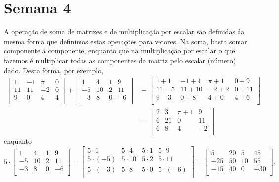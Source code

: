 \documentclass[../livro.tex]{subfiles}  %
\begin{document}
\chapter{Semana 4}


A operação de soma de matrizes e de multiplicação por escalar são definidas da mesma forma que definimos estas operações para vetores. Na soma, basta somar componente a componente, enquanto que na multiplicação por escalar o que fazemos é multiplicar todas as componentes da matriz pelo escalar (número) dado. Desta forma, por exemplo,
\begin{align*}
\left[
\begin{array}{cccc}
1 & -1 & \pi & 0 \\
11 & 11 & -2 & 0 \\
9 & 0 & 4 & 4 \\
\end{array}
\right] +
\left[
\begin{array}{cccc}
1 & 4 & 1 & 9 \\
-5 & 10 & 2 & 11 \\
-3 & 8 & 0 & -6 \\
\end{array}
\right] & =
\left[
\begin{array}{cccc}
1+1 & -1 +4 & \pi + 1 & 0+ 9 \\
11-5 & 11+10 & -2+2 & 0+11 \\
9-3 & 0+8 & 4+0 & 4-6 \\
\end{array}
\right] \\
& =
\left[
\begin{array}{cccc}
2 & 3 & \pi + 1 & 9 \\
6 & 21 & 0 & 11 \\
6 & 8 & 4 & -2 \\
\end{array}
\right]
\end{align*}
enquanto
\begin{equation}
5\cdot \left[
\begin{array}{cccc}
1 & 4 & 1 & 9 \\
-5 & 10 & 2 & 11 \\
-3 & 8 & 0 & -6 \\
\end{array}
\right] =
\left[
\begin{array}{cccc}
5\cdot 1 & 5\cdot 4 & 5\cdot 1 & 5\cdot 9 \\
5\cdot (-5) & 5\cdot 10 & 5\cdot 2 & 5\cdot 11 \\
5\cdot (-3) & 5\cdot 8 & 5\cdot 0 & 5\cdot (-6) \\
\end{array}
\right] =
\left[
\begin{array}{cccc}
5 & 20 & 5 & 45 \\
-25 & 50 & 10 & 55 \\
-15 & 40 & 0 & -30 \\
\end{array}
\right].
\end{equation}
\end{document}

